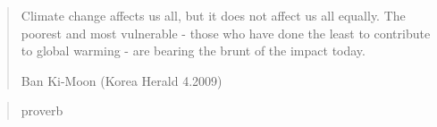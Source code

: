
\null{}
\begin{flushright}
\begin{quote}
Climate change affects us all, but it does not affect us all equally. 
The poorest and most vulnerable -
those who have done the least to contribute to global warming -
are bearing the brunt of the impact today. 

\hfill Ban Ki-Moon  (Korea Herald 4.2009)\break
\end{quote}


\begin{quote}

\hfill proverb  \break
\end{quote}
\end{flushright}


